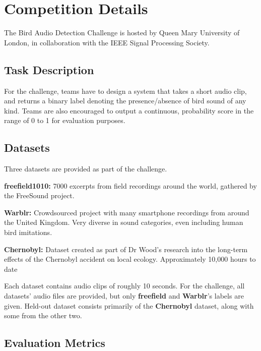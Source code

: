 \documentclass[10pt,twocolumn,letterpaper]{article}
\begin{document}
\section{Competition Details}

The Bird Audio Detection Challenge is hosted by Queen Mary University of
London, in collaboration with the IEEE Signal Processing Society. 

\subsection{Task Description}

For the challenge, teams have to design a system that takes a short audio
clip, and returns a binary label denoting the presence/absence of bird
sound of any kind. Teams are also encouraged to output a continuous,
probability score in the range of 0 to 1 for evaluation purposes.

\subsection{Datasets}

Three datasets are provided as part of the challenge.

\textbf{freefield1010:} 7000 excerpts from field recordings around the
world, gathered by the FreeSound project.

\textbf{Warblr:} Crowdsourced project with many smartphone recordings from
around the United Kingdom. Very diverse in sound categories, even including
human bird imitations.

\textbf{Chernobyl:} Dataset created as part of Dr Wood's research into the
long-term effects of the Chernobyl accident on local ecology. Approximately
10,000 hours to date

Each dataset contains audio clips of roughly 10 seconds. For the challenge,
all datasets' audio files are provided, but only \textbf{freefield} and
\textbf{Warblr}'s labels are given. Held-out dataset consists primarily of
the \textbf{Chernobyl} dataset, along with some from the other two.

\subsection{Evaluation Metrics}
\end{document}
